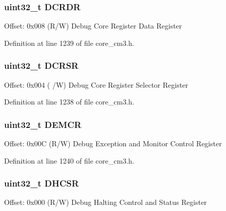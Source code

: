 \subsubsection[{\texorpdfstring{D\+C\+R\+DR}{DCRDR}}]{ uint32\+\_\+t D\+C\+R\+DR}\hypertarget{struct_core_debug___type_ad1dbd0dd98b6d9327f70545e0081ddbf}{}\label{struct_core_debug___type_ad1dbd0dd98b6d9327f70545e0081ddbf}
Offset\+: 0x008 (R/W) Debug Core Register Data Register 

Definition at line 1239 of file core\+\_\+cm3.\+h.

\subsubsection[{\texorpdfstring{D\+C\+R\+SR}{DCRSR}}]{ uint32\+\_\+t D\+C\+R\+SR}\hypertarget{struct_core_debug___type_ab74a9ec90ad18e4f7a20362d362b754a}{}\label{struct_core_debug___type_ab74a9ec90ad18e4f7a20362d362b754a}
Offset\+: 0x004 ( /W) Debug Core Register Selector Register 

Definition at line 1238 of file core\+\_\+cm3.\+h.

\subsubsection[{\texorpdfstring{D\+E\+M\+CR}{DEMCR}}]{ uint32\+\_\+t D\+E\+M\+CR}\hypertarget{struct_core_debug___type_aa99de5f8c609f10c25ed51f57b2edd74}{}\label{struct_core_debug___type_aa99de5f8c609f10c25ed51f57b2edd74}
Offset\+: 0x00C (R/W) Debug Exception and Monitor Control Register 

Definition at line 1240 of file core\+\_\+cm3.\+h.

\subsubsection[{\texorpdfstring{D\+H\+C\+SR}{DHCSR}}]{ uint32\+\_\+t D\+H\+C\+SR}\hypertarget{struct_core_debug___type_a94ca828091a9226ab6684fbf30e52909}{}\label{struct_core_debug___type_a94ca828091a9226ab6684fbf30e52909}
Offset\+: 0x000 (R/W) Debug Halting Control and Status Register 

